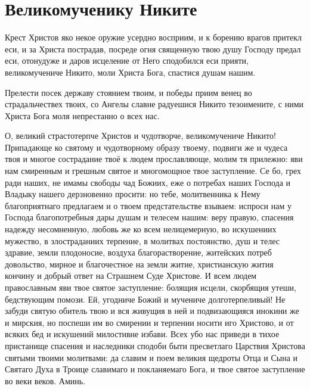 \section{Великомученику Никите}\begin{mymulticols}




Крест Христов яко некое оружие усердно восприим, и к борению врагов притекл еси, и за Христа пострадав, посреде огня священную твою душу Господу предал еси, отонудуже и даров исцеление от Него сподобился еси прияти, великомучениче Никито, моли Христа Бога, спастися душам нашим.



Прелести посек державу стоянием твоим, и победы приим венец во страдальчествех твоих, со Ангелы славне радуешися Никито тезоимените, с ними Христа Бога моля непрестанно о всех нас.




О, великий страстотерпче Христов и чудотворче, великомучениче Никито! Припадающе ко святому и чудотворному образу твоему, подвиги же и чудеса твоя и многое сострадание твоё к людем прославляюще, молим тя прилежно: яви нам смиренным и грешным святое и многомощное твое заступление. Се бо, грех ради наших, не имамы свободы чад Божиих, еже о потребах наших Господа и Владыку нашего дерзновенно просити: но тебе, молитвенника к Нему благоприятнаго предлагаем и о твоем предстательстве взываем: испроси нам у Господа благопотребныя дары душам и телесем нашим: веру правую, спасения надежду несомненную, любовь же ко всем нелицемерную, во искушениих мужество, в злостраданиих терпение, в молитвах постоянство, душ и телес здравие, земли плодоносие, воздуха благорастворение, житейских потреб довольство, мирное и благочестное на земли житие, христианскую жития кончину и добрый ответ на Страшнем Суде Христове. И всем людем православным яви твое святое заступление: болящия исцели, скорбящия утеши, бедствующим помози. Ей, угодниче Божий и мучениче долготерпеливый! Не забуди святую обитель твою и вся живущия в ней и подвизающияся инокини же и мирския, но поспеши им во смирении и терпении носити иго Христово, и от всяких бед и искушений милостивне избави. Всех убо нас приведи в тихое пристанище спасения и наследники сподоби быти пресветлаго Царствия Христова святыми твоими молитвами: да славим и поем великия щедроты Отца и Сына и Святаго Духа в Троице славимаго и покланяемаго Бога, и твое святое заступление во веки веков. Аминь. 


\end{mymulticols}

